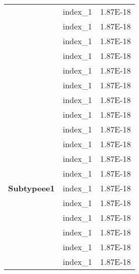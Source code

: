 \begin{longtable}{@{\extracolsep{\fill}}lll@{}}
                                          & index\_1                            & 1.87E-18            \\
                                          & index\_1                            & 1.87E-18            \\
                                          & index\_1                            & 1.87E-18            \\
                                          & index\_1                            & 1.87E-18            \\
                                          & index\_1                            & 1.87E-18            \\
                                          \hline %
                                          & index\_1                            & 1.87E-18            \\
                                          & index\_1                            & 1.87E-18            \\
                                          & index\_1                            & 1.87E-18            \\
                                          & index\_1                            & 1.87E-18            \\
                                          & index\_1                            & 1.87E-18            \\
                                          & index\_1                            & 1.87E-18            \\
                                          & index\_1                            & 1.87E-18            \\
\textbf{Subtypeee1}                       & index\_1                            & 1.87E-18            \\
                                          & index\_1                            & 1.87E-18            \\
                                          & index\_1                            & 1.87E-18            \\
                                          & index\_1                            & 1.87E-18            \\
                                          & index\_1                            & 1.87E-18            \\
                                          & index\_1                            & 1.87E-18            \\

\end{longtable}
